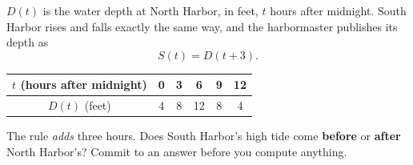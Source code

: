 \documentclass[10pt]{article}
\begin{document}
\vspace{0.1in}

\boxguard[20]
\begin{hookbox}
$D(t)$ is the water depth at North Harbor, in feet, $t$ hours after midnight.
South Harbor rises and falls exactly the same way, and the harbormaster
publishes its depth as
\[
  S(t) = D(t + 3).
\]

\smallskip
\begin{center}
\renewcommand{\arraystretch}{1.4}
\begin{tabular}{|c|c|c|c|c|c|}
\hline
$t$ (hours after midnight) & 0 & 3 & 6 & 9 & 12 \\
\hline
$D(t)$ (feet) & 4 & 8 & 12 & 8 & 4 \\
\hline
\end{tabular}
\end{center}
\smallskip

The rule \textit{adds} three hours. Does South Harbor's high tide come
\textbf{before} or \textbf{after} North Harbor's? Commit to an answer before
you compute anything.
\end{hookbox}

\vspace{0.1in}
\end{document}

